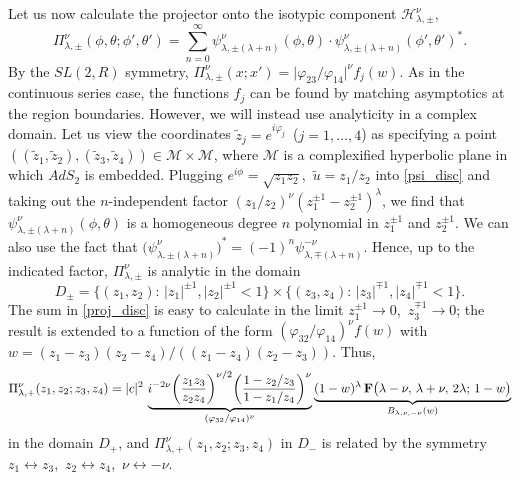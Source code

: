 \documentclass[11pt]{article}
\newcommand{\hgfs}{\mathbf{F}}
\newcommand{\lt}{\left}
\newcommand{\rt}{\right}
\newcommand{\vp}{\varphi}
\newcommand{\calH}{\mathcal{H}}
\newcommand{\calM}{\mathcal{M}}
\newcommand{\RR}{\mathbb{R}}
\DeclareMathOperator{\SL}{SL}
\DeclareMathOperator{\AdS}{AdS}
\newcommand{\tu}{\tilde{u}}
\newcommand{\tz}{\tilde{z}}
\newcommand{\lam}{\lambda}
\newcommand{\ov}{\over}
\def\widetilde#1{#1}%
\def\AdS{AdS}
\def\SL{SL}
\def\RR{R}
\begin{document}
Let us now calculate the projector onto the isotypic component $\calH^{\nu}_{\lambda,\pm}$,
\begin{equation}\label{proj_disc}
\Pi^{\nu}_{\lambda,\pm}(\phi,\theta;\phi',\theta')
=\sum_{n=0}^{\infty}\psi^{\nu}_{\lam,\pm(\lam+n)}(\phi,\theta)
\cdot\psi^{\nu}_{\lam,\pm(\lam+n)}(\phi',\theta')^{*}.
\end{equation}
By the $\widetilde{\SL}(2,\RR)$ symmetry, $\Pi^{\nu}_{\lambda,\pm}(x;x')
=\bigl|\vp_{23}/\vp_{14}\bigr|^{\nu}f_{j}(w)$. As in the continuous series case, the functions $f_{j}$ can be found by matching asymptotics at the region boundaries. However, we will instead use analyticity in a complex domain. Let us view the coordinates $\tz_j=e^{i\vp_j}$\, ($j=1,\dots,4$) as specifying a point $\lt((\tz_1,\tz_2),(\tz_3,\tz_4)\rt) \in\calM\times\calM$, where $\calM$ is a complexified hyperbolic plane in which $\AdS_2$ is embedded. Plugging $e^{i\phi}=\sqrt{z_1z_2}$,\, $\tu=z_1/z_2$ into \eqref{psi_disc} and taking out the $n$-independent factor $(z_1/z_2)^{\nu}(z_1^{\pm1}-z_2^{\pm1})^{\lambda}$, we find that $\psi^{\nu}_{\lam,\pm(\lam+n)}(\phi,\theta)$ is a homogeneous degree $n$ polynomial in $z_1^{\pm1}$ and $z_2^{\pm1}$. We can also use the fact that $\bigl(\psi^{\nu}_{\lam,\pm(\lam+n)}\bigr)^* =(-1)^{n} \psi^{-\nu}_{\lam,\mp(\lam+n)}$. Hence, up to the indicated factor, $\Pi^{\nu}_{\lambda,\pm}$ is analytic in the domain
\begin{equation}
D_{\pm}=\bigl\{ (z_1, z_2):\, |z_1|^{\pm1}, |z_2|^{\pm1} < 1 \bigr\}
\times \bigl\{ (z_3, z_4):\, |z_3|^{\mp1}, |z_4|^{\mp1} <1 \bigr\}.
\end{equation}
The sum in \eqref{proj_disc} is easy to calculate in the limit $z_1^{\pm1} \to 0$,\, $z_3^{\mp 1} \to 0$; the result is extended to a function of the form $(\vp_{32}/\vp_{14})^{\nu}f(w)$ with $w=(z_1-z_3)(z_2-z_4)/((z_1-z_4)(z_2-z_3))$. Thus,
\begin{equation}\label{tPsip}
\Pi^{\nu}_{\lambda,+}(z_1, z_2; z_3, z_4)
=|c|^2\,\underbrace{i^{-2\nu}\biggl({z_1 z_3 \ov z_2 z_4}\biggr)^{\nu/2}
\biggl({1-z_2 / z_3 \ov 1-z_1/ z_4}\biggr)^{\nu}}_{(\vp_{32}/\vp_{14})^{\nu}}
\underbrace{(1-w)^\lam\, \hgfs\bigl(\lam-\nu,\,\lam + \nu,\,2\lam;\,1-w\bigr)}
_{B_{\lambda,\nu,-\nu}(w)}
\end{equation}
in the domain $D_{+}$, and $\Pi^{\nu}_{\lambda,+}(z_1,z_2;z_3,z_4)$ in $D_{-}$ is related by the symmetry $z_1 \leftrightarrow z_3$,\, $z_2 \leftrightarrow z_4$,\, $\nu \leftrightarrow -\nu$.
\end{document}
